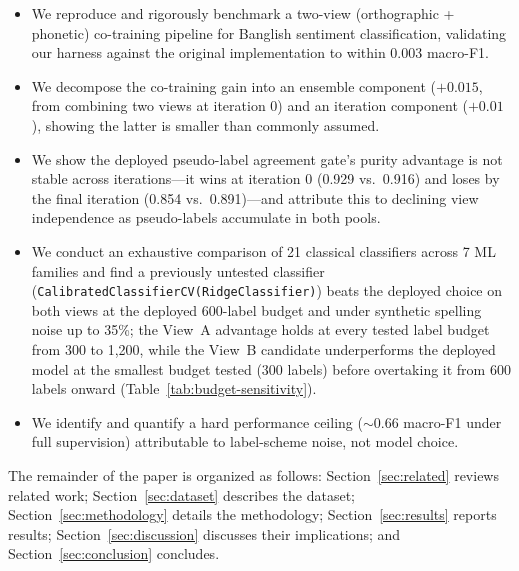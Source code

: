\documentclass[conference]{IEEEtran}
\begin{document}
\begin{itemize}
  \item We reproduce and rigorously benchmark a two-view (orthographic +
        phonetic) co-training pipeline for Banglish sentiment classification,
        validating our harness against the original implementation
        \citep{pantho_prototype_repo} to within 0.003 macro-F1.

  \item We decompose the co-training gain into an ensemble component
        ($+0.015$, from combining two views at iteration 0) and an iteration
        component ($+0.01$), showing the latter is smaller than commonly
        assumed.

  \item We show the deployed pseudo-label agreement gate's purity advantage is
        not stable across iterations---it wins at iteration 0 (0.929 vs.\
        0.916) and loses by the final iteration (0.854 vs.\ 0.891)---and
        attribute this to declining view independence as pseudo-labels
        accumulate in both pools.

  \item We conduct an exhaustive comparison of 21 classical classifiers across
        7 ML families and find a previously untested classifier
        (\texttt{CalibratedClassifierCV(}\allowbreak\texttt{RidgeClassifier)})
        beats the deployed
        choice on both views at the deployed 600-label budget and under
        synthetic spelling noise up to 35\%; the View~A advantage holds at
        every tested label budget from 300 to 1{,}200, while the View~B
        candidate underperforms the deployed model at the smallest budget
        tested (300 labels) before overtaking it from 600 labels onward
        (Table~\ref{tab:budget-sensitivity}).

  \item We identify and quantify a hard performance ceiling ($\sim$0.66
        macro-F1 under full supervision) attributable to label-scheme noise,
        not model choice.
\end{itemize}

The remainder of the paper is organized as follows: Section~\ref{sec:related}
reviews related work; Section~\ref{sec:dataset} describes the dataset;
Section~\ref{sec:methodology} details the methodology;
Section~\ref{sec:results} reports results; Section~\ref{sec:discussion}
discusses their implications; and Section~\ref{sec:conclusion} concludes.

\end{document}
